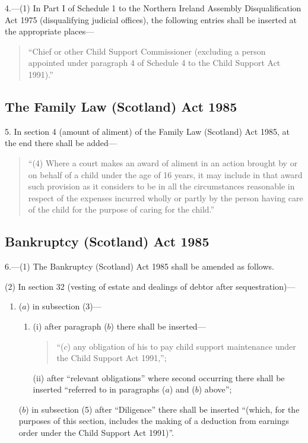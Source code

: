 \documentclass[12pt,a4paper]{article}
\begin{document}
4.---(1) In Part I of Schedule 1 to the Northern Ireland Assembly Disqualification Act 1975 (disqualifying judicial offices), the following entries shall be inserted at the appropriate places---
\begin{quotation}
 “Chief or other Child Support Commissioner (excluding a person appointed under paragraph 4 of Schedule 4 to the Child Support Act 1991).''
\end{quotation}


\subsection*{The Family Law (Scotland) Act 1985}

5. In section 4 (amount of aliment) of the Family Law (Scotland) Act 1985, at the end there shall be added—
\begin{quotation}
“(4) Where a court makes an award of aliment in an action brought by or on behalf of a child under the age of 16 years, it may include in that award such provision as it considers to be in all the circumstances reasonable in respect of the expenses incurred wholly or partly by the person having care of the child for the purpose of caring for the child.”
\end{quotation}

\subsection*{Bankruptcy (Scotland) Act 1985}

6.---(1) The Bankruptcy (Scotland) Act 1985 shall be amended as follows.

\begin{sloppypar}
(2) In section 32 (vesting of estate and dealings of debtor after se\-ques\-tra\-tion)---
\end{sloppypar}
\begin{enumerate}\item[]
($a$) in subsection (3)---
\begin{enumerate}\item[]
(i) after paragraph ($b$) there shall be inserted—
\begin{quotation}
“($c$) any obligation of his to pay child support maintenance under the Child Support Act 1991,”;
\end{quotation}

(ii) after “relevant obligations” where second occurring there shall be inserted “referred to in paragraphs ($a$) and ($b$) above”;
\end{enumerate}

($b$) in subsection (5) after “Diligence” there shall be inserted “(which, for the purposes of this section, includes the making of a deduction from earnings order under the Child Support Act 1991)”.
\end{enumerate}
\end{document}
